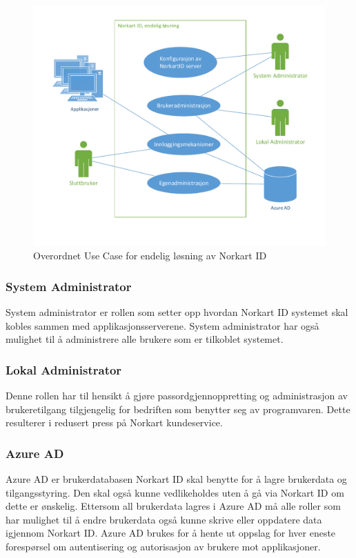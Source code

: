 \begin{figure}[h]
    \includegraphics[scale=0.65]{graphics/OverordnetUseCase-a}
    \caption{Overordnet Use Case for endelig løsning av Norkart ID}
    \label{fig:OverordnetUseCase-a}
\end{figure}

\subsubsection*{System Administrator}
System administrator er rollen som setter opp hvordan Norkart ID systemet skal kobles sammen med applikasjonsserverene. System administrator har også mulighet til å administrere alle brukere som er tilkoblet systemet. 

\subsubsection*{Lokal Administrator}
Denne rollen har til hensikt å gjøre passordgjennoppretting og administrasjon av brukeretilgang tilgjengelig for bedriften som benytter seg av programvaren. Dette resulterer i redusert press på Norkart kundeservice. 

\subsubsection*{Azure AD}
Azure AD er brukerdatabasen Norkart ID skal benytte for å lagre brukerdata og tilgangsstyring. Den skal også kunne vedlikeholdes uten å gå via Norkart ID om dette er ønskelig. Ettersom all brukerdata lagres i Azure AD må alle roller som har mulighet til å endre brukerdata også kunne skrive eller oppdatere data igjennom Norkart ID. Azure AD brukes for å hente ut oppslag for hver eneste forespørsel om autentisering og autorisasjon av brukere mot applikasjoner.

